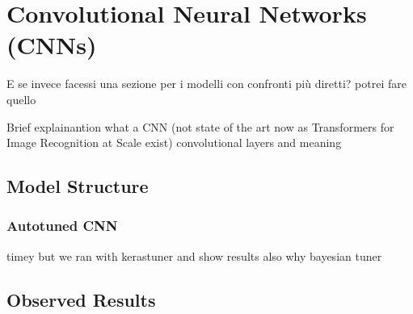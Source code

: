\section{Convolutional Neural Networks (CNNs)}
\commentline E se invece facessi una sezione per i modelli con confronti più diretti?
potrei fare quello

Brief explainantion what a CNN (not state of the art now as Transformers for Image Recognition at Scale exist)
convolutional layers and meaning

\subsection{Model Structure}

\subsubsection{Autotuned CNN}
timey but we ran with kerastuner and show results
also why bayesian tuner

\subsection{Observed Results}


